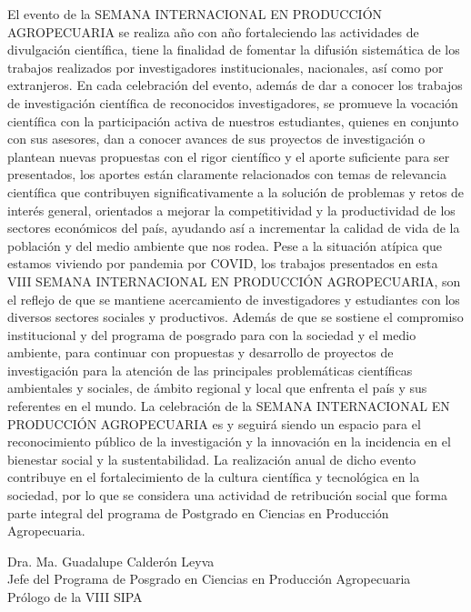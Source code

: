 El evento de la SEMANA INTERNACIONAL EN PRODUCCIÓN AGROPECUARIA se realiza año con año fortaleciendo las actividades de divulgación científica, tiene la finalidad de fomentar la difusión sistemática de los trabajos realizados por investigadores institucionales, nacionales, así como por extranjeros. En cada celebración del evento, además de dar a conocer los trabajos de investigación científica de reconocidos investigadores, se promueve la vocación científica con la participación activa de nuestros estudiantes, quienes en conjunto con sus asesores, dan a conocer avances de sus proyectos de investigación o plantean nuevas propuestas con el rigor científico y el aporte suficiente para ser presentados, los aportes están claramente relacionados con temas de relevancia científica que contribuyen significativamente a la solución de problemas y retos de interés general, orientados a mejorar la competitividad y la productividad de los sectores económicos del país, ayudando así a incrementar la calidad de vida de la población y del medio ambiente que nos rodea. Pese a la situación atípica que estamos viviendo por pandemia por COVID, los trabajos presentados en esta VIII SEMANA INTERNACIONAL EN PRODUCCIÓN AGROPECUARIA, son el reflejo de que se mantiene acercamiento de investigadores y estudiantes con los diversos sectores sociales y productivos. Además de que se sostiene el compromiso institucional y del programa de posgrado para con la sociedad y el medio ambiente, para continuar con propuestas y desarrollo de proyectos de investigación para la atención de las principales problemáticas científicas ambientales y sociales, de ámbito regional y local que enfrenta el país y sus referentes en el mundo. La celebración de la SEMANA INTERNACIONAL EN PRODUCCIÓN AGROPECUARIA es y seguirá siendo un espacio para el reconocimiento público de la investigación y la innovación en la incidencia en el bienestar social y la sustentabilidad. La realización anual de dicho evento contribuye en el fortalecimiento de la cultura científica y tecnológica en la sociedad, por lo que se considera una actividad de retribución social que forma parte integral del programa de Postgrado en Ciencias en Producción Agropecuaria.

\raggedleft
Dra. Ma. Guadalupe Calderón Leyva\\[1mm]
Jefe del Programa de Posgrado en Ciencias en Producción Agropecuaria\\[2mm]
Prólogo de la VIII SIPA

\raggedright
\newpage

